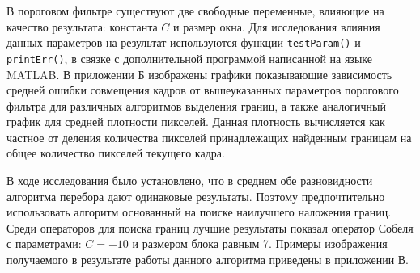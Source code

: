 В пороговом фильтре существуют две свободные переменные, влияющие на качество результата: константа $C$ и размер окна. Для исследования влияния данных параметров на результат используются функции \texttt{testParam()} и \texttt{printErr()}, в связке с дополнительной программой написанной на языке MATLAB. В приложении Б изображены графики показывающие зависимость средней ошибки совмещения кадров от вышеуказанных параметров порогового фильтра для различных алгоритмов выделения границ, а также аналогичный график для средней плотности пикселей. Данная плотность вычисляется как частное от деления количества пикселей принадлежащих найденным границам на общее количество пикселей текущего кадра.

В ходе исследования было установлено, что в среднем обе разновидности алгоритма перебора дают одинаковые результаты. Поэтому предпочтительно использовать алгоритм основанный на поиске наилучшего наложения границ. Среди операторов для поиска границ лучшие результаты показал оператор Собеля с параметрами: $C=-10$ и размером блока равным 7. Примеры изображения получаемого в результате работы данного алгоритма приведены в приложении В.

